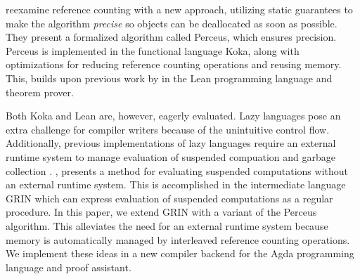 \documentclass[9pt, twocolumn]{article}
\begin{document}
\citet{reinking2021} reexamine reference counting with a new approach, utilizing static guarantees to make the algorithm \emph{precise} so objects can be deallocated as soon as possible.
They present a formalized algorithm called Perceus, which ensures precision. 
Perceus is implemented in the functional language Koka, along with optimizations for reducing reference counting operations and reusing memory.
This, builds upon previous work by \citet{ullrich2021} in the Lean programming language and theorem prover. 


Both Koka and Lean are, however, eagerly evaluated. 
Lazy languages pose an extra challenge for compiler writers because of the unintuitive control flow. 
Additionally, previous implementations of lazy languages require an external runtime system to manage evaluation of suspended compuation and garbage collection \citep{johnsson1984, augustsson1984, jones1992, turner1979}.
\citet{johnsson1991}, presents a method for evaluating suspended computations without an external runtime system.
This is accomplished in the intermediate language GRIN which can express evaluation of suspended computations as a regular procedure.
In this paper, we extend GRIN with a variant of the Perceus algorithm.
This alleviates the need for an external runtime system because memory is automatically managed by interleaved reference counting operations. 
We implement these ideas in a new compiler backend for the Agda programming language and proof assistant. 


\end{document}
